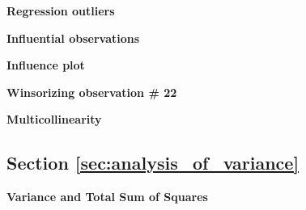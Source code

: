 \begin{exercise}
\label{ex:regression_outliers}

\textbf{Regression outliers}



\end{exercise}

\begin{exercise}
\label{ex:influential_observations}

\textbf{Influential observations}




\end{exercise}

\begin{exercise}
\label{ex:influence_plot}

\textbf{Influence plot}



\end{exercise}

\begin{exercise}
\label{ex:leave_out_observation}

\textbf{Winsorizing observation \# 22}




\end{exercise}

\begin{exercise}
\label{ex:vif}

\textbf{Multicollinearity}




\end{exercise}

\subsection{Section \ref{sec:analysis_of_variance}}

\begin{exercise}
\label{ex:anova}

\textbf{Variance and Total Sum of Squares}







\end{exercise}

